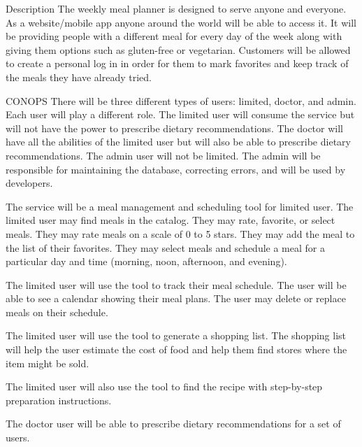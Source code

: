 \documentclass[a4paper,10pt]{article}
\author{\docauthor}
\title{\doctitle}
\begin{document}
\myFirstPageHeader
\begin{mySubsection}{Description}
\noindent
The weekly meal planner is designed to serve anyone and everyone.
As a website/mobile app anyone around the world will be able to access it.
It will be providing people with a different meal for every day of the week along with giving them options such as gluten-free or vegetarian.
Customers will be allowed to create a personal log in in order for them to mark favorites and keep track of the meals they have already tried.
\end{mySubsection}
\begin{mySubsection}{CONOPS}
\noindent
There will be three different types of users: limited, doctor, and admin.
Each user will play a different role.
The limited user will consume the service but will not have the power to prescribe dietary recommendations.
The doctor will have all the abilities of the limited user but will also be able to prescribe dietary recommendations.
The admin user will not be limited.
The admin will be responsible for maintaining the database, correcting errors, and will be used by developers.
\newline

\noindent
The service will be a meal management and scheduling tool for limited user.
The limited user may find meals in the catalog.
They may rate, favorite, or select meals.
They may rate meals on a scale of 0 to 5 stars.
They may add the meal to the list of their favorites.
They may select meals and schedule a meal for a particular day and time (morning, noon, afternoon, and evening).
\newline

\noindent
The limited user will use the tool to track their meal schedule.
The user will be able to see a calendar showing their meal plans.
The user may delete or replace meals on their schedule.
\newline

\noindent
The limited user will use the tool to generate a shopping list.
The shopping list will help the user estimate the cost of food and help them find stores where the item might be sold.
\newline

\noindent
The limited user will also use the tool to find the recipe with step-by-step preparation instructions.
\newline

\noindent
The doctor user will be able to prescribe dietary recommendations for a set of users.
\end{mySubsection}
\end{document}

